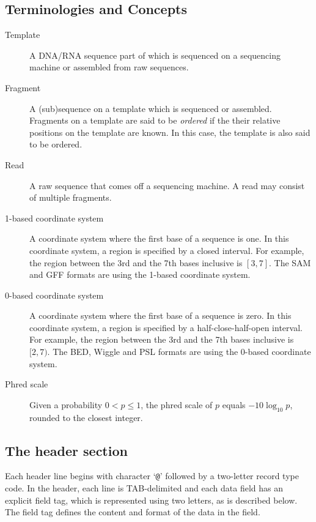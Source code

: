 \documentclass[10pt]{article}
\begin{document}
\subsection{Terminologies and Concepts}

\begin{description}
\item[Template] A DNA/RNA sequence part of which is sequenced on a
  sequencing machine or assembled from raw sequences.
\item[Fragment] A (sub)sequence on a template which is sequenced or
  assembled. Fragments on a template are said to be \emph{ordered} if
  the their relative positions on the template are known. In this case,
  the template is also said to be ordered.
\item[Read] A raw sequence that comes off a sequencing machine. A read
  may consist of multiple fragments.
\item[1-based coordinate system] A coordinate system where the first
  base of a sequence is one. In this coordinate system, a region is
  specified by a closed interval. For example, the region between the 3rd
  and the 7th bases inclusive is $[3,7]$. The SAM and GFF formats are
  using the 1-based coordinate system.
\item[0-based coordinate system] A coordinate system where the first
  base of a sequence is zero. In this coordinate system, a region is
  specified by a half-close-half-open interval. For example, the region
  between the 3rd and the 7th bases inclusive is $[2,7)$. The BED,
  Wiggle and PSL formats are using the 0-based coordinate system.
\item[Phred scale] Given a probability $0<p\le 1$, the phred scale of $p$
  equals $-10\log_{10}p$, rounded to the closest integer.
\end{description}

\subsection{The header section}
Each header line begins with character `{\tt @}' followed by a
two-letter record type code. In the header, each line is TAB-delimited
and each data field has an explicit field tag, which is represented
using two letters, as is described below. The field tag defines the
content and format of the data in the field.
\end{document}
